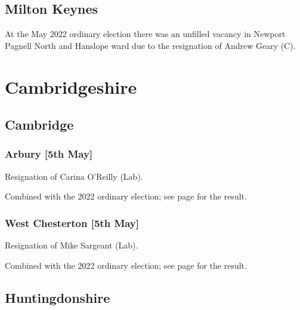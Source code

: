 \documentclass[a4paper,openany]{book}
\begin{document}
\begin{resultsiii}
\subsection*{Milton Keynes}

At the May 2022 ordinary election there was an unfilled vacancy in Newport Pagnell North and Hanslope ward due to the resignation of Andrew Geary (C).%

\section{Cambridgeshire}

\subsection*{Cambridge}

\subsubsection*{Arbury \hspace*{\fill}\nolinebreak[1]%
	\enspace\hspace*{\fill}
	[5th May]}


Resignation of Carina O'Reilly (Lab).

Combined with the 2022 ordinary election; see page \pageref{CambridgeArbury} for the result.

\subsubsection*{West Chesterton \hspace*{\fill}\nolinebreak[1]%
	\enspace\hspace*{\fill}
	[5th May]}


Resignation of Mike Sargeant (Lab).

Combined with the 2022 ordinary election; see page \pageref{CambridgeWestChesterton} for the result.

\subsection*{Huntingdonshire}


\end{resultsiii}
\end{document}
